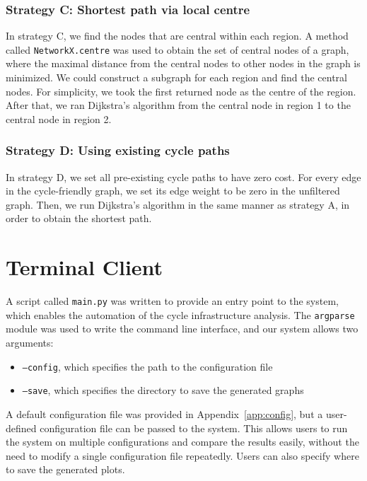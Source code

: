 \documentclass[12pt,a4paper]{report}
\begin{document}
\subsubsection*{Strategy C: Shortest path via local centre}
In strategy C, we find the nodes that are central within each region. A method called \texttt{NetworkX.centre} was used to obtain the set of central nodes of a graph, where the maximal distance from the central nodes to other nodes in the graph is minimized. We could construct a subgraph for each region and find the central nodes. For simplicity, we took the first returned node as the centre of the region. After that, we ran Dijkstra's algorithm from the central node in region 1 to the central node in region 2.

\subsubsection*{Strategy D: Using existing cycle paths}
In strategy D, we set all pre-existing cycle paths to have zero cost. For every edge in the cycle-friendly graph, we set its edge weight to be zero in the unfiltered graph. Then, we run Dijkstra's algorithm in the same manner as strategy A, in order to obtain the shortest path.

\section{Terminal Client}\label{sec:client}
A script called \texttt{main.py} was written to provide an entry point to the system, which enables the automation of the cycle infrastructure analysis. The \texttt{argparse} module was used to write the command line interface, and our system allows two arguments:
\begin{itemize}
    \item \texttt{--config}, which specifies the path to the configuration file
    \item \texttt{--save}, which specifies the directory to save the generated graphs
\end{itemize}

A default configuration file was provided in Appendix~\ref{app:config}, but a user-defined configuration file can be passed to the system. This allows users to run the system on multiple configurations and compare the results easily, without the need to modify a single configuration file repeatedly. Users can also specify where to save the generated plots.
\end{document}
